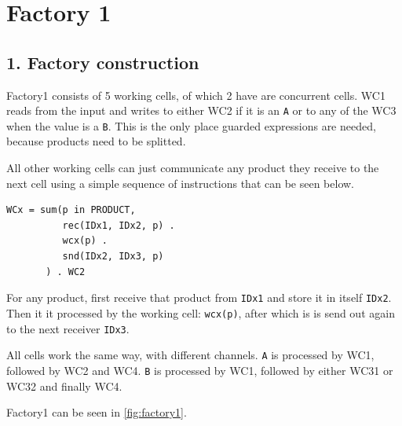 \documentclass[a4paper,12px]{article}
\begin{document}
\newcommand{\Sum}[2]{\sum^{#2}_{#1}}
\newcommand{\E}[1]{{\mathbb{E}\left[#1\right]}}
\newcommand{\var}[1]{{\text{var}\left[#1\right]}}
\newcommand{\diffpart}[1]{\frac{\partial}{\partial{} #1}}
\newcommand{\?}{\stackrel{?}{=}}
\newcommand{\intinf}{\int\limits_{-\infty}^{\infty}}
\newcommand{\intnulinf}{\int\limits_{0}^{\infty}}
\newcommand{\intpi}{\int\limits_{0}^{2\pi}}
\newcommand{\argmin}[1]{\underset{#1}{\mathop{\mathrm{argmin}}}}
\newcommand{\argmax}[1]{\underset{#1}{\mathop{\mathrm{argmax}}}}


\section*{Factory 1}
\subsection*{1. Factory construction}

Factory1 consists of 5 working cells, of which 2 have are concurrent cells. WC1
reads from the input and writes to either WC2 if it is an \verb|A| or to any of
the WC3 when the value is a \verb|B|. This is the only place guarded
expressions are needed, because products need to be splitted.

All other working cells can just communicate any product they receive to the
next cell using a simple sequence of instructions that can be seen below.

\begin{verbatim}
WCx = sum(p in PRODUCT,
          rec(IDx1, IDx2, p) .
          wcx(p) .
          snd(IDx2, IDx3, p)
       ) . WC2
\end{verbatim}

For any product, first receive that product from \verb|IDx1| and store it in
itself \verb|IDx2|. Then it it processed by the working cell: \verb|wcx(p)|,
after which is is send out again to the next receiver \verb|IDx3|.

All cells work the same way, with different channels. \verb|A| is processed by WC1, followed by WC2 and WC4.
\verb|B| is processed by WC1, followed by either WC31 or WC32 and finally WC4.

Factory1 can be seen in \autoref{fig:factory1}.
\end{document}
